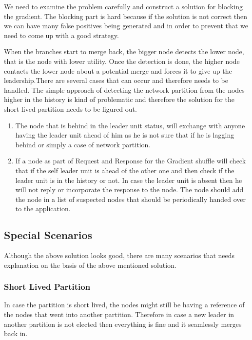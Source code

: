 \documentclass[a4paper, 11pt]{article}
\begin{document}
We need to examine the problem carefully and construct a solution for blocking the gradient. The blocking part is hard because if the solution is not correct then we can have many false positives being generated and in order to prevent that we need to come up with a good strategy.


When the branches start to merge back, the bigger node detects the lower node, that is the node with lower utility. Once the detection is done, the higher node contacts the lower node about a potential merge and forces it to give up the leadership.There are several cases that can occur and therefore needs to be handled. The simple approach of detecting the network partition from the nodes higher in  the history is kind of problematic and therefore the solution for the short lived partition needs to be figured out.

\begin{enumerate}

\item The node that is behind in the leader unit status, will exchange with anyone having the leader unit ahead of him as he is not sure that if he is lagging behind or simply a case of network partition. 

\item If a node as part of Request and Response for the Gradient shuffle will check that if the self leader unit is ahead of the other one and then check if the leader unit is in the history or not. In case the leader unit is absent then he will not reply or incorporate the response to the node. The node should add the node in a list of suspected nodes that should be periodically handed over to the application. 

\end{enumerate}

\subsection{Special Scenarios}

Although the above solution looks good, there are many scenarios that needs explanation on the basis of the above mentioned solution.

\subsubsection{Short Lived Partition}
In case the partition is short lived, the nodes might still be having a reference of the nodes that went into another partition. Therefore in case a new leader in another partition is not elected then everything is fine and it seamlessly merges back in.\\
\end{document}

